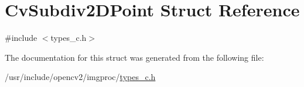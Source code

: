 \hypertarget{structCvSubdiv2DPoint}{\section{Cv\-Subdiv2\-D\-Point Struct Reference}
\label{structCvSubdiv2DPoint}
}


{\ttfamily \#include $<$types\-\_\-c.\-h$>$}



The documentation for this struct was generated from the following file\-:\begin{DoxyCompactItemize}
\item 
/usr/include/opencv2/imgproc/\hyperlink{imgproc_2types__c_8h}{types\-\_\-c.\-h}\end{DoxyCompactItemize}
